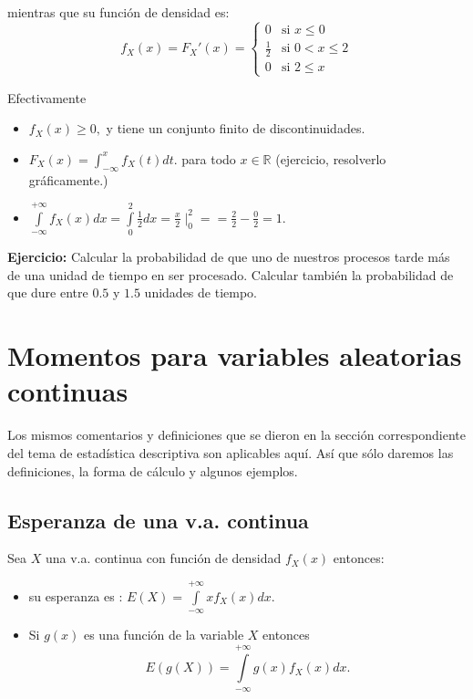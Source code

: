 \documentclass[handout]{beamer}\usepackage[]{graphicx}\usepackage[]{color}
\newcommand{\RR}{\mathbb{R}}
\renewcommand{\leq}{\leqslant}
\renewcommand{\geq}{\geqslant}
\theoremstyle{plain}
\theoremstyle{definition}
\begin{document}
\begin{frame}
mientras que su función de densidad es:
$$f_{X}(x)=F_{X}'(x)=\left\{\begin{array}{ll}
0 & \mbox{si } x\leq 0\\
\frac{1}{2} & \mbox{si } 0<x\leq 2\\
0 & \mbox{si } 2\leq x
\end{array}\right.$$

Efectivamente
\begin{itemize}
\item $f_{X}(x)\geq 0,$ y tiene un conjunto finito de discontinuidades.
\item $F_X(x)=\int_{-\infty}^x f_X(t) dt.$ para todo $x\in \RR$ (ejercicio,
resolverlo gráficamente.)
\item $\int\limits_{-\infty}^{+\infty}f_{X}(x)dx=
\int\limits_{0}^{2}\frac{1}{2}dx=\frac{x}{2}\mid_{0}^{2}=
=\frac{2}{2}-\frac{0}{2}=1.$
\end{itemize}
\end{frame}

\begin{frame}
\textbf{Ejercicio:} Calcular la probabilidad de que uno de nuestros procesos tarde
más de una unidad de tiempo en ser procesado. Calcular también la  probabilidad de
que dure entre $0.5$ y $1.5$ unidades de tiempo.
\end{frame}
\section{Momentos para variables aleatorias continuas}
\begin{frame}
Los mismos comentarios y definiciones que se dieron en la sección correspondiente del tema
de estadística descriptiva %
son aplicables aquí. Así que sólo daremos las
definiciones, la forma de cálculo y algunos ejemplos.
\end{frame}

\subsection{Esperanza de  una v.a. continua}


\begin{frame}
Sea $X$ una v.a. continua con función de densidad $f_{X}(x)$
entonces:

\begin{itemize}
\item su esperanza es :
$E(X)=\int\limits_{-\infty}^{+\infty} xf_{X}(x)dx.$
\item Si $g(x)$ es una función de la variable $X$ entonces
$$E(g(X))=\int\limits_{-\infty}^{+\infty} g(x)f_{X}(x)dx.$$
\end{itemize}
\end{frame}
\end{document}
